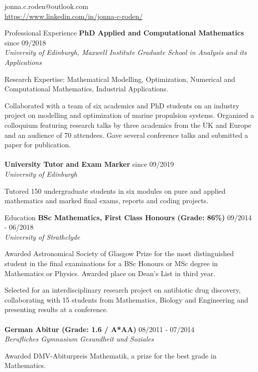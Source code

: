 \documentclass{resume} %
\begin{document}
 \hfill{jonna.c.roden@outlook.com} \\
 \hfill{\url{https://www.linkedin.com/in/jonna-c-roden/}}
 
\begin{rSection}{Professional Experience}
{\bf PhD Applied and Computational Mathematics} \hfill{since 09/2018}\\
{\it University of Edinburgh, Maxwell Institute Graduate School in Analysis and its Applications}

Research Expertise: Mathematical Modelling, Optimization, Numerical and Computational Mathematics, Industrial Applications.

  Collaborated with a team of six academics and PhD students on an industry project on modelling and optimization of marine propulsion systems. Organized a colloquium featuring research talks by three academics from the UK and Europe and an audience of 70 attendees. Gave several conference talks and submitted a paper for publication.
\\
\\
{\bf University Tutor and Exam Marker} \hfill{since 09/2019}\\
{\it University of Edinburgh}

Tutored 150 undergraduate students in six modules on pure and applied mathematics and marked final exams, reports and coding projects.
 
\end{rSection}		
\begin{rSection}{Education}	
{\bf BSc Mathematics, First Class Honours (Grade: 86\%)} \hfill{09/2014 - 06/2018}	\\
{\it University of Strathclyde}

Awarded Astronomical Society of Glasgow Prize for the most distinguished student in the final examinations for a BSc Honours or MSc degree in Mathematics or Physics. Awarded place on Dean's List in third year.

Selected for an interdisciplinary research project on antibiotic drug discovery, collaborating with 15 students from Mathematics, Biology and Engineering and presenting results at a conference.
\\
\\
{\bf German Abitur (Grade: 1.6 / A*AA)} \hfill{08/2011 - 07/2014}\\
{\it Berufliches Gymnasium Gesundheit und Soziales}	

Awarded DMV-Abiturpreis Mathematik, a prize for the best grade in Mathematics.	
\end{rSection}	
\end{document}
